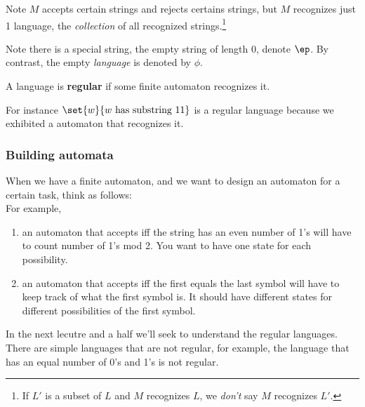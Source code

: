 Note $M$ accepts certain strings and rejects certains strings, but $M$ recognizes just 1 language, the {\it collection} of all recognized strings.\footnote{If $L'$ is a subset of $L$ and $M$ recognizes $L$, we {\it don't} say $M$ recognizes $L'$.}

Note there is a special string, the empty string of length 0, denote $\ep$. By contrast, the empty {\it language} is denoted by $\phi$.

\begin{df}
A language is \textbf{regular} if some finite automaton recognizes it. 
\end{df}
For instance $\set{w}{w\text{ has substring }11}$ is a regular language because we exhibited a automaton that recognizes it.\\

\subsubsection{Building automata}

\vskip0.15in
When we have a finite automaton, and we want to design an automaton for a certain task, think as follows: \\

\vskip0.15in
For example, 
\begin{enumerate}
\item
an automaton that accepts iff the string has an even number of 1's will have to count number of 1's mod 2. You want to have one state for each possibility.
\item 
an automaton that accepts iff the first equals the last symbol will have to keep track of what the first symbol is. It should have different states for different possibilities of the first symbol.
\end{enumerate}


In the next lecutre and a half we'll seek to understand the regular languages. There are simple languages that are not regular, for example, the language that has an equal number of 0's and 1's is not regular.

